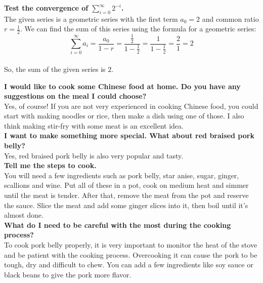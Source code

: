\documentclass[11pt]{article}
\begin{document}
\begin{tcolorbox}[colback=white,colframe=black!75!black,title=RWKV-4-Raven-14B,float=ht]
\textbf{Test the convergence of $\sum_{i=0}^\infty 2^{-i}$.}\\

The given series is a geometric series with the first term $a_0 = 2$ and common ratio $r = \frac{1}{2}$. We can find the sum of this series using the formula for a geometric series:\\
$$\sum_{i=0}^\infty a_i = \frac{a_0}{1-r} = \frac{\frac{1}{2}}{1-\frac{1}{2}} = \frac{1}{1-\frac{1}{2}} = \frac{2}{1} = 2$$\\
So, the sum of the given series is $\boxed{2}$.\\
\end{tcolorbox}

\begin{tcolorbox}[colback=white,colframe=black!75!black,title=RWKV-4-Raven-14B]
\textbf{I would like to cook some Chinese food at home. Do you have any suggestions on the meal I could choose?}\\

Yes, of course! If you are not very experienced in cooking Chinese food, you could start with making noodles or rice, then make a dish using one of those. I also think making stir-fry with some meat is an excellent idea.\\

\textbf{I want to make something more special. What about red braised pork belly?}\\

Yes, red braised pork belly is also very popular and tasty.\\

\textbf{Tell me the steps to cook.}\\

You will need a few ingredients such as pork belly, star anise, sugar, ginger, scallions and wine. Put all of these in a pot, cook on medium heat and simmer until the meat is tender. After that, remove the meat from the pot and reserve the sauce. Slice the meat and add some ginger slices into it, then boil until it's almost done.\\

\textbf{What do I need to be careful with the most during the cooking process?}\\

To cook pork belly properly, it is very important to monitor the heat of the stove and be patient with the cooking process. Overcooking it can cause the pork to be tough, dry and difficult to chew. You can add a few ingredients like soy sauce or black beans to give the pork more flavor.\\


\end{tcolorbox}
\end{document}
